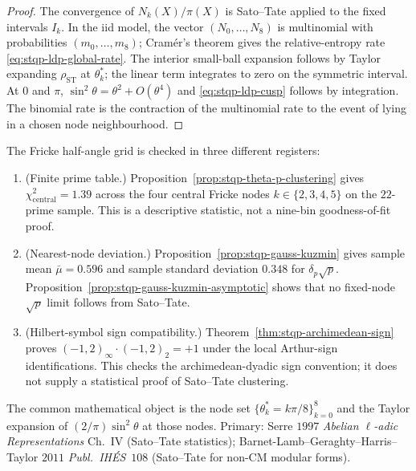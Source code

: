 \begin{proof}
The convergence of $N_k(X)/\pi(X)$ is Sato--Tate applied to the fixed
intervals $I_k$. In the iid model, the vector
$(N_0,\ldots,N_8)$ is multinomial with probabilities
$(m_0,\ldots,m_8)$; Cramér's theorem gives the relative-entropy rate
\eqref{eq:stqp-ldp-global-rate}. The interior small-ball expansion
follows by Taylor expanding $\rho_{\mathrm{ST}}$ at $\theta_k^*$; the
linear term integrates to zero on the symmetric interval. At
$0$ and $\pi$, $\sin^2\theta=\theta^2+O(\theta^4)$ and
\eqref{eq:stqp-ldp-cusp} follows by integration. The binomial rate is
the contraction of the multinomial rate to the event of lying in a
chosen node neighbourhood.
\end{proof}

\begin{remark}
\label{rem:stqp-fricke-z8-three-paths}
%
The Fricke half-angle grid is checked in three different registers:
\begin{enumerate}[label=\textup{(\roman*)}]
\item \textup{(Finite prime table.)}
Proposition~\ref{prop:stqp-theta-p-clustering} gives
$\chi^2_{\mathrm{central}} = 1.39$ across the four central Fricke
nodes $k \in \{2, 3, 4, 5\}$ on the $22$-prime sample. This is a
descriptive statistic, not a nine-bin goodness-of-fit proof.
\item \textup{(Nearest-node deviation.)}
Proposition~\ref{prop:stqp-gauss-kuzmin} gives
sample mean $\bar\mu = 0.596$ and sample standard deviation $0.348$
for $\delta_p\sqrt p$. Proposition~\ref{prop:stqp-gauss-kuzmin-asymptotic}
shows that no fixed-node $\sqrt p$ limit follows from Sato--Tate.
\item \textup{(Hilbert-symbol sign compatibility.)}
Theorem~\ref{thm:stqp-archimedean-sign} proves
$(-1,2)_\infty\cdot(-1,2)_2=+1$ under the local Arthur-sign
identifications. This checks the archimedean-dyadic sign convention;
it does not supply a statistical proof of Sato--Tate clustering.
\end{enumerate}
The common mathematical object is the node set
$\{\theta_k^*=k\pi/8\}_{k=0}^8$ and the Taylor expansion of
$(2/\pi)\sin^2\theta$ at those nodes. Primary: Serre $1997$
\emph{Abelian $\ell$-adic Representations} Ch.~IV (Sato--Tate statistics);
Barnet-Lamb--Geraghty--Harris--Taylor $2011$ \emph{Publ.\ IH\'ES}~$108$
(Sato--Tate for non-CM modular forms).
\end{remark}
